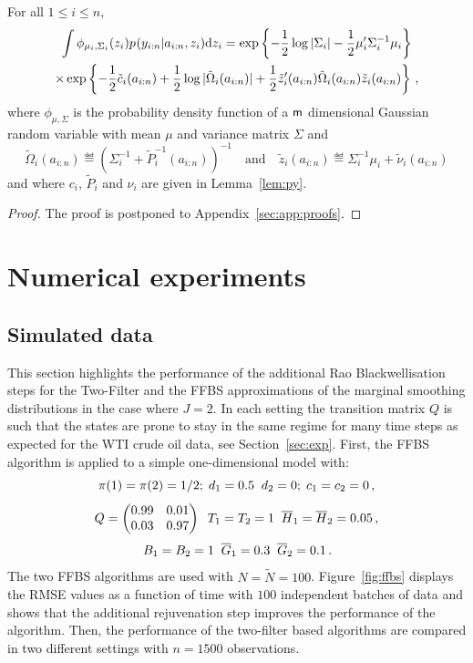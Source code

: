\begin{lemma}
\label{lem:integral:gammap}
For all $1\le i\le n$,
\begin{multline*}
\int \phi_{\mu_i,\Sigma_i}(z_i)p_{}(y_{i:n}|a_{i:n},z_i)\mathrm{d} z_{i} = \exp\left\{-\frac{1}{2}\log |\Sigma_i| - \frac{1}{2}\mu_i'\Sigma^{-1}_i\mu_i\right\}\\
\times\exp\left\{-\frac{1}{2}\tilde{c}_{i}(a_{i:n})+\frac{1}{2}\log|\tilde{\Omega}_{i}(a_{i:n})| +\frac{1}{2}\tilde{z}'_i(a_{i:n})\tilde{\Omega}_{i}(a_{i:n})\tilde{z}_i(a_{i:n})\right\}\,,
\end{multline*}
where $\phi_{\mu,\Sigma}$ is the probability density function of a $\mathsf{m}$ dimensional Gaussian random variable with mean $\mu$ and variance matrix $\Sigma$ and
\[
\tilde{\Omega}_{i}(a_{i:n})\eqdef \left(\Sigma_i^{-1} + \tilde{P}_{i}^{-1}(a_{i:n})\right)^{-1}\quad\mbox{and}\quad
\tilde{z}_i(a_{i:n})\eqdef \Sigma_i^{-1}\mu_i+\tilde{\nu}_{i}(a_{i:n})
\]
and where $c_{i}$, $\tilde{P}_{i}$ and $\nu_{i}$ are given in Lemma~\ref{lem:py}.
\end{lemma}
\begin{proof}
The proof is postponed to Appendix~\ref{sec:app:proofs}.
\end{proof}


\section{Numerical experiments}
\label{sec:numerical:experiments}
\subsection{Simulated data}
This section highlights the performance of the additional Rao Blackwellisation steps for the Two-Filter and the FFBS approximations of the marginal smoothing distributions in the case where $J=2$. In each setting the transition matrix $Q$ is such that the states are prone to stay in the same regime  for many time steps as expected for the WTI crude oil data,  see Section~\ref{sec:exp}. First, the FFBS algorithm is applied to a simple one-dimensional model with:
\[
\pi(1)=\pi(2) = 1/2\\;\;d_1 = 0.5\;\; d_2 = 0;\;c_1= c_2 = 0 \,,
\]
\[
Q = \begin{pmatrix}0.99 & 0.01\\ 0.03 & 0.97\end{pmatrix}\;\;T_1 = T_2 = 1\;\;\overline{H}_1 = \overline{H}_2= 0.05\,,
\]
\[
B_1 = B_2 =1\;\;\overline{G}_1 = 0.3\;\;\overline{G}_2 = 0.1\,.
\]
The two FFBS algorithms are used with $N = \tilde{N} = 100$.
Figure~\ref{fig:ffbs} displays the RMSE values as a function of time with $100$ independent batches of data and shows that the additional rejuvenation step improves the performance of the algorithm. Then, the performance of the two-filter based algorithms are compared in two different settings with $n=1500$ observations.
